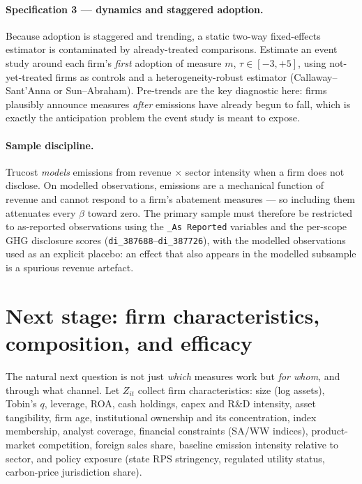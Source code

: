 \documentclass[11pt]{article}
\newcommand{\code}[1]{\texttt{\small #1}}
\begin{document}
\paragraph{Specification 3 --- dynamics and staggered adoption.} Because
adoption is staggered and trending, a static two-way fixed-effects estimator
is contaminated by already-treated comparisons. Estimate an event study around
each firm's \emph{first} adoption of measure $m$, $\tau \in [-3,+5]$, using
not-yet-treated firms as controls and a heterogeneity-robust estimator
(Callaway--Sant'Anna or Sun--Abraham). Pre-trends are the key diagnostic here:
firms plausibly announce measures \emph{after} emissions have already begun to
fall, which is exactly the anticipation problem the event study is meant to
expose.

\paragraph{Sample discipline.} Trucost \emph{models} emissions from
revenue $\times$ sector intensity when a firm does not disclose. On modelled
observations, emissions are a mechanical function of revenue and cannot
respond to a firm's abatement measures --- so including them attenuates every
$\beta$ toward zero. The primary sample must therefore be restricted to
as-reported observations using the \code{*\_As Reported} variables and the
per-scope GHG disclosure scores (\code{di\_387688}--\code{di\_387726}), with
the modelled observations used as an explicit placebo: an effect that also
appears in the modelled subsample is a spurious revenue artefact.

\section{Next stage: firm characteristics, composition, and efficacy}

The natural next question is not just \emph{which} measures work but
\emph{for whom}, and through what channel. Let $Z_{it}$ collect firm
characteristics: size (log assets), Tobin's $q$, leverage, ROA, cash holdings,
capex and R\&D intensity, asset tangibility, firm age, institutional ownership
and its concentration, index membership, analyst coverage, financial
constraints (SA/WW indices), product-market competition, foreign sales share,
baseline emission intensity relative to sector, and policy exposure (state RPS
stringency, regulated utility status, carbon-price jurisdiction share).
\end{document}

